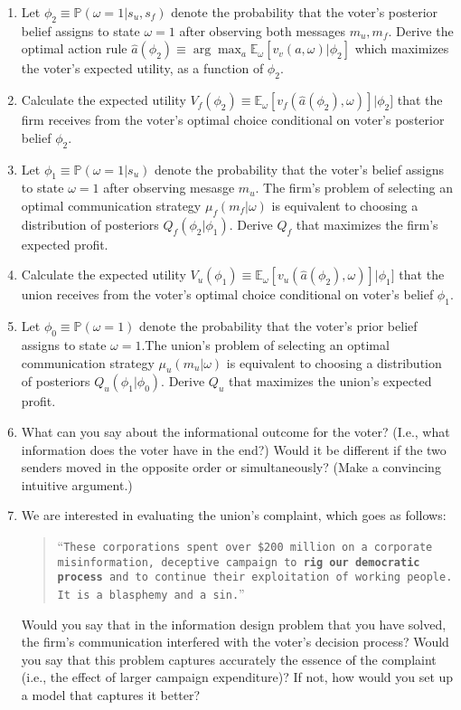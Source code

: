 \documentclass[a4paper]{article}
\begin{document}
	\begin{enumerate}
		\item Let $\phi_2 \equiv \mathbb{P}(\omega=1 | s_u,s_f)$ denote the probability that the voter's posterior belief assigns to state $\omega=1$ after observing both messages $m_u,m_f$. Derive the optimal action rule $\hat{a}(\phi_2) \equiv \arg \max_a \mathbb{E}_\omega[v_v(a,\omega)|\phi_2]$ which maximizes the voter's expected utility, as a function of $\phi_2$.
		
		\item Calculate the expected utility $V_f(\phi_2) \equiv \mathbb{E}_\omega [v_f(\hat{a}(\phi_2),\omega)] | \phi_2]$ that the firm receives from the voter's optimal choice conditional on voter's posterior belief $\phi_2$.
		
		\item Let $\phi_1 \equiv \mathbb{P}(\omega=1 | s_u)$ denote the probability that the voter's belief assigns to state $\omega=1$ after observing mesasge $m_u$. The firm's problem of selecting an optimal communication strategy $\mu_f(m_f|\omega)$ is equivalent to choosing a distribution of posteriors $Q_f(\phi_2|\phi_1)$. Derive $Q_f$ that maximizes the firm's expected profit.
		
		\item Calculate the expected utility $V_u(\phi_1) \equiv \mathbb{E}_\omega [v_u(\hat{a}(\phi_2),\omega)] | \phi_1]$ that the union receives from the voter's optimal choice conditional on voter's belief $\phi_1$.
		
		\item Let $\phi_0 \equiv \mathbb{P}(\omega=1)$ denote the probability that the voter's prior belief assigns to state $\omega=1$.The union's problem of selecting an optimal communication strategy $\mu_u(m_u|\omega)$ is equivalent to choosing a distribution of posteriors $Q_u(\phi_1|\phi_0)$. Derive $Q_u$ that maximizes the union's expected profit.
		
		\item What can you say about the informational outcome for the voter? (I.e., what information does the voter have in the end?) Would it be different if the two senders moved in the opposite order or simultaneously? (Make a convincing intuitive argument.)
		
		\item We are interested in evaluating the union's complaint, which goes as follows:
		\begin{quote}
			``\texttt{These corporations spent over \$200 million on a corporate misinformation, deceptive campaign to \textbf{rig our democratic process} and to continue their exploitation of working people. It is a blasphemy and a sin.}''
		\end{quote}
		Would you say that in the information design problem that you have solved, the firm's communication interfered with the voter's decision process? Would you say that this problem captures accurately the essence of the complaint (i.e., the effect of larger campaign expenditure)? If not, how would you set up a model that captures it better?
	\end{enumerate}
\end{document}
